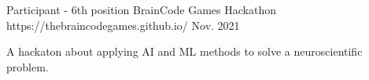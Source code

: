 

\begin{cventries}
%
%
%
  \cventry
    {Participant - 6th position} %
    {BrainCode Games Hackathon} %
    {https://thebraincodegames.github.io/} %
    {Nov. 2021} %
    {
      \begin{cvitems} %
        \item {A hackaton about applying AI and ML methods to solve a neuroscientific problem.}
      \end{cvitems}
    }





\end{cventries}
